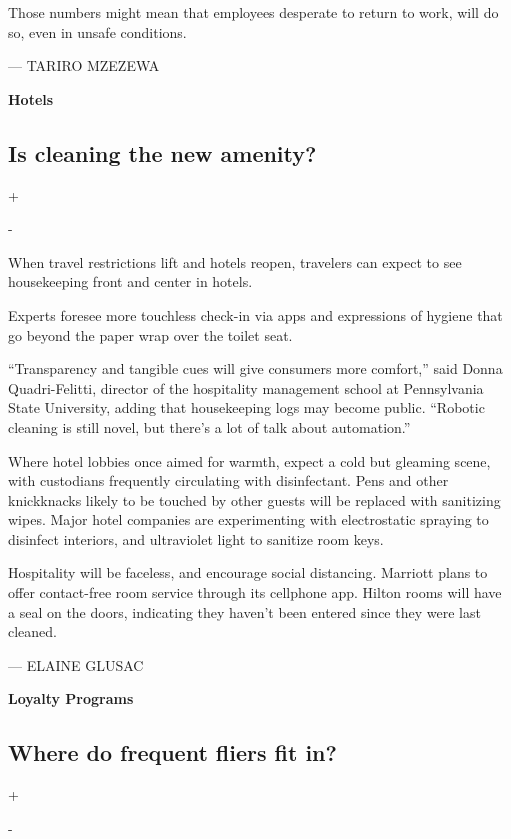 Those numbers might mean that employees desperate to return to work,
will do so, even in unsafe conditions.

--- TARIRO MZEZEWA

\textbf{Hotels}

\hypertarget{is-cleaning-the-new-amenity}{%
\subsection{Is cleaning the new
amenity?}\label{is-cleaning-the-new-amenity}}

+

-

When travel restrictions lift and hotels reopen, travelers can expect to
see housekeeping front and center in hotels.

Experts foresee more touchless check-in via apps and expressions of
hygiene that go beyond the paper wrap over the toilet seat.

``Transparency and tangible cues will give consumers more comfort,''
said Donna Quadri-Felitti, director of the hospitality management school
at Pennsylvania State University, adding that housekeeping logs may
become public. ``Robotic cleaning is still novel, but there's a lot of
talk about automation.''

Where hotel lobbies once aimed for warmth, expect a cold but gleaming
scene, with custodians frequently circulating with disinfectant. Pens
and other knickknacks likely to be touched by other guests will be
replaced with sanitizing wipes. Major hotel companies are experimenting
with electrostatic spraying to disinfect interiors, and ultraviolet
light to sanitize room keys.

Hospitality will be faceless, and encourage social distancing. Marriott
plans to offer contact-free room service through its cellphone app.
Hilton rooms will have a seal on the doors, indicating they haven't been
entered since they were last cleaned.

--- ELAINE GLUSAC

\textbf{Loyalty Programs}

\hypertarget{where-do-frequent-fliers-fit-in}{%
\subsection{Where do frequent fliers fit
in?}\label{where-do-frequent-fliers-fit-in}}

+

-


